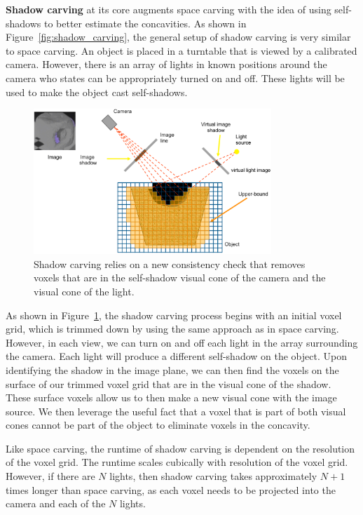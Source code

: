 \documentclass[a4paper, 12pt]{article}
\renewcommand\emph{\textbf}
\numberwithin{equation}{section}
\begin{document}
\emph{Shadow carving} at its core augments space carving with the idea of using self-shadows to better estimate the concavities. As shown in Figure~\ref{fig:shadow_carving}, the general setup of shadow carving is very similar to space carving. An object is placed in a turntable that is viewed by a calibrated camera. However, there is an array of lights in known positions around the camera who states can be appropriately turned on and off. These lights will be used to make the object cast self-shadows.

\begin{figure}[h!]
    \centering
    \includegraphics[width = 0.8\textwidth]{figures/shadow_carving_detailed.png}
    \caption{Shadow carving relies on a new consistency check that removes voxels that are in the self-shadow visual cone of the camera and the visual cone of the light.}
    \label{fig:shadow_carving_detailed}
\end{figure}

As shown in Figure~\ref{fig:shadow_carving_detailed}, the shadow carving process begins with an initial voxel grid, which is trimmed down by using the same approach as in space carving. However, in each view, we can turn on and off each light in the array surrounding the camera. Each light will produce a different self-shadow on the object. Upon identifying the shadow in the image plane, we can then find the voxels on the surface of our trimmed voxel grid that are in the visual cone of the shadow. These surface voxels allow us to then make a new visual cone with the image source. We then leverage the useful fact that a voxel that is part of both visual cones cannot be part of the object to eliminate voxels in the concavity. 

Like space carving, the runtime of shadow carving is dependent on the resolution of the voxel grid. The runtime scales cubically with resolution of the voxel grid. However, if there are $N$ lights, then shadow carving takes approximately $N+1$ times longer than space carving, as each voxel needs to be projected into the camera and each of the $N$ lights.
\end{document}
